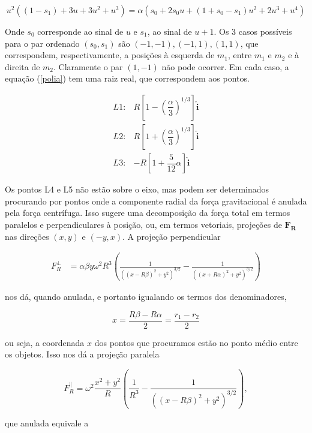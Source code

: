 \begin{equation}
u^2((1-s_1)+3u+3u^2+u^3) = \alpha(s_0 +2s_0u+(1+s_0-s_1)u^2+2u^3+u^4) \label{polia}
\end{equation}

Onde $s_0$ corresponde ao sinal de $u$ e $s_1$, ao sinal de $u+1$. Os 3 casos possíveis para o par ordenado $(s_0,s_1)$ são $(-1,-1), (-1,1), (1,1)$, que correspondem, respectivamente, a posições à esquerda de $m_1$, entre $m_1$ e $m_2$ e à direita de $m_2$. Claramente o par $(1,-1)$ não pode ocorrer. Em cada caso, a equação (\ref{polia}) tem uma raiz real, que correspondem aos pontos.

\begin{eqnarray}
L1: & R\left[1-\left(\dfrac{\alpha}{3}\right)^{1/3}\right]\mathbf{\hat{i}} \\
L2: & R\left[1+\left(\dfrac{\alpha}{3}\right)^{1/3}\right]\mathbf{\hat{i}} \\
L3: & -R\left[1 + \dfrac{5}{12}\alpha \right]\mathbf{\hat{i}}
\end{eqnarray}

Os pontos L4 e L5 não estão sobre o eixo, mas podem ser determinados procurando por pontos onde a componente radial da força gravitacional é anulada pela força centrífuga. Isso sugere uma decomposição da força total em termos paralelos e perpendiculares à posição, ou, em termos vetoriais, projeções de $\mathbf{F_R}$ nas direções $(x, y)$ e $(-y, x)$. A projeção perpendicular

\begin{align}
    F_R^\perp &= \alpha\beta y \omega^2R^3\left( \frac{1}{((x-R\beta)^2+y^2)^{3/2}} - \frac{1}{((x + R\alpha)^2+y^2)^{3/2}} \right)
\end{align}

nos dá, quando anulada, e portanto igualando os termos dos denominadores,

\begin{equation}
    x = \frac{R\beta - R\alpha}{2} = \frac{r_1 - r_2}{2}
\end{equation}

ou seja, a coordenada $x$ dos pontos que procuramos estão no ponto médio entre os objetos. Isso nos dá a projeção paralela

\begin{equation}
    F_R^\parallel = \omega^2\frac{x^2 + y^2}{R}\left( \frac{1}{R^3} - \frac{1}{((x-R\beta)^2 + y^2)^{3/2}}\right),
\end{equation}

que anulada equivale a

